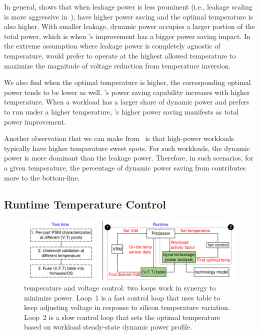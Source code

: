 In general,  shows that when leakage power is less prominent (i.e., leakage scaling is more aggressive in~), \tistates have higher power saving and the optimal temperature is also higher. With smaller leakage, dynamic power occupies a larger portion of the total power, which is when \tistate's improvement has a bigger power saving impact. In the extreme assumption where leakage power is completely agnostic of temperature, \tistate would prefer to operate at the highest allowed temperature to maximize the magnitude of voltage reduction from temperature inversion.

We also find when the optimal temperature is higher, the corresponding optimal power tends to be lower as well.  \tistate's power saving capability increases with higher temperature. When a workload has a larger share of dynamic power and prefers to run under a higher temperature, \tistate's higher power saving manifests as total power improvement.

Another observation that we can make from~ is that high-power workloads typically have higher temperature sweet spots. For such workloads, the dynamic power is more dominant than the leakage power. Therefore, in such scenarios, for a given temperature, the percentage of dynamic power saving from \tistate contributes more to the bottom-line.

\subsection{Runtime Temperature Control}
\label{sec:runtime}

\begin{figure}[t!]
\centering
    \includegraphics[trim=0 0 0 0,clip,width=.96\linewidth]{graphs/runtime-mechanism_v3.pdf}
    \caption{\tistate temperature and voltage control: two loops work in synergy to minimize power. Loop~1 is a fast control loop that uses \tistate table to keep adjusting voltage in response to silicon temperature variation. Loop~2 is a slow control loop that sets the optimal temperature based on workload steady-state dynamic power profile.}
    \label{fig:runtime}
    \vspace*{-.1in}
\end{figure}

